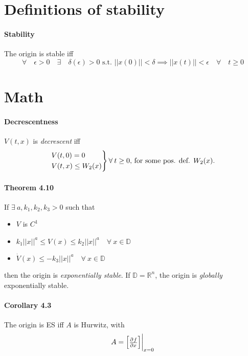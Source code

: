 
\section{Definitions of stability}
\paragraph{Stability} The origin is stable iff
\begin{equation}
	\forall \quad \epsilon > 0 \quad \exists \quad \delta(\epsilon) > 0
	\mbox{ s.t. }
	||x(0)|| < \delta \implies ||x(t)|| < \epsilon \quad \forall \quad t \geq 0
\end{equation}

\section{Math}

\paragraph{Decrescentness}
$V(t,x)$ is \emph{decrescent} iff
\begin{equation}
	\begin{rcases}
		V(t,0) =    0      \\
		V(t,x) \leq W_2(x)
	\end{rcases}
	\forall \: t \geq 0
	\mbox{, for some pos. def. }
	W_2(x).
\end{equation}

\paragraph{Theorem 4.10}
If $\exists \: a, k_1, k_2, k_3 > 0$ such that
\begin{itemize}
	\item $V$ is $C^1$
	\item $k_1 ||x||^a \leq V(x) \leq k_2 ||x||^a \quad \forall \: x \in \mathbb{D}$
	\item $\dot{V}(x) \leq - k_3 ||x||^a \quad \forall \: x \in \mathbb{D}$
\end{itemize}
then the origin is \emph{exponentially stable}. If $\mathbb{D} = \mathbb{R}^n$, the origin is \emph{globally} exponentially stable.

\paragraph{Corollary 4.3}
The origin is ES iff $A$ is Hurwitz, with
\begin{equation}
	A =
	\begin{bmatrix}
		\pd{f}{x}
	\end{bmatrix}
	\evalat{x=0}
\end{equation}

